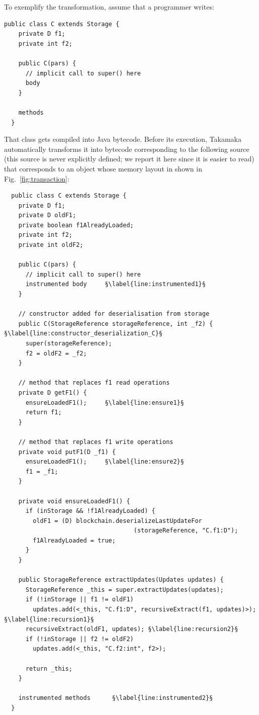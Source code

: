 \documentclass[10pt]{llncs}
\begin{document}
To exemplify the transformation, assume that a programmer writes:
%
\begin{lstlisting}[numbers=none,frame=none]
  public class C extends Storage {
    private D f1;
    private int f2;

    public C(pars) {
      // implicit call to super() here
      body
    }

    methods
  }
\end{lstlisting}
%
That class gets compiled into Java bytecode. Before its execution,
Takamaka automatically transforms it into bytecode corresponding to
the following source (this source is never explicitly
defined; we report it here since it is easier to read)
that corresponds to an object whose memory layout in shown
in Fig.~\ref{fig:transaction}:
%
\begin{lstlisting}
  public class C extends Storage {
    private D f1;
    private D oldF1;
    private boolean f1AlreadyLoaded;
    private int f2;
    private int oldF2;

    public C(pars) {
      // implicit call to super() here
      instrumented body     §\label{line:instrumented1}§
    }

    // constructor added for deserialisation from storage
    public C(StorageReference storageReference, int _f2) { §\label{line:constructor_deserialization_C}§
      super(storageReference);
      f2 = oldF2 = _f2;
    }

    // method that replaces f1 read operations
    private D getF1() {
      ensureLoadedF1();     §\label{line:ensure1}§
      return f1;
    }

    // method that replaces f1 write operations
    private void putF1(D _f1) {
      ensureLoadedF1();     §\label{line:ensure2}§
      f1 = _f1;
    }

    private void ensureLoadedF1() {
      if (inStorage && !f1AlreadyLoaded) {
        oldF1 = (D) blockchain.deserializeLastUpdateFor
                                    (storageReference, "C.f1:D");
        f1AlreadyLoaded = true;
      }
    }

    public StorageReference extractUpdates(Updates updates) {
      StorageReference _this = super.extractUpdates(updates);
      if (!inStorage || f1 != oldF1)
        updates.add(<_this, "C.f1:D", recursiveExtract(f1, updates)>); §\label{line:recursion1}§
      recursiveExtract(oldF1, updates); §\label{line:recursion2}§
      if (!inStorage || f2 != oldF2)
        updates.add(<_this, "C.f2:int", f2>);

      return _this;
    }

    instrumented methods      §\label{line:instrumented2}§
  }
\end{lstlisting}
\end{document}
